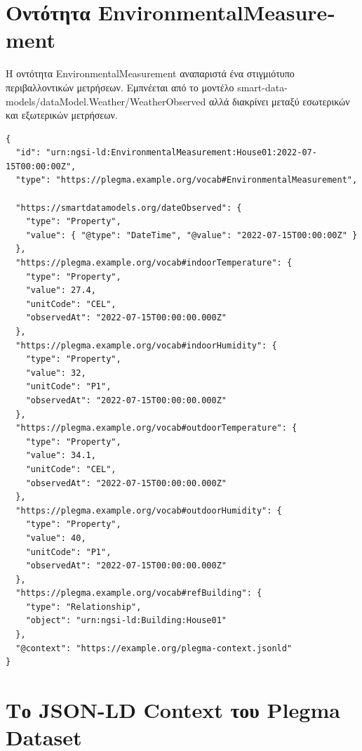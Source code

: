 \section{Οντότητα \textlatin{EnvironmentalMeasurement}}
\label{sec:entity-environmental}

Η οντότητα \textlatin{EnvironmentalMeasurement} αναπαριστά ένα στιγμιότυπο
περιβαλλοντικών μετρήσεων. Εμπνέεται από το μοντέλο
\textlatin{smart-data-models/dataModel.Weather/WeatherObserved} αλλά διακρίνει
μεταξύ εσωτερικών και εξωτερικών μετρήσεων.

\vspace{0.5cm}
\begin{lstlisting}[language={}, caption={EnvironmentalMeasurement entity for House01.}]
{
  "id": "urn:ngsi-ld:EnvironmentalMeasurement:House01:2022-07-15T00:00:00Z",
  "type": "https://plegma.example.org/vocab#EnvironmentalMeasurement",

  "https://smartdatamodels.org/dateObserved": {
    "type": "Property",
    "value": { "@type": "DateTime", "@value": "2022-07-15T00:00:00Z" }
  },
  "https://plegma.example.org/vocab#indoorTemperature": {
    "type": "Property",
    "value": 27.4,
    "unitCode": "CEL",
    "observedAt": "2022-07-15T00:00:00.000Z"
  },
  "https://plegma.example.org/vocab#indoorHumidity": {
    "type": "Property",
    "value": 32,
    "unitCode": "P1",
    "observedAt": "2022-07-15T00:00:00.000Z"
  },
  "https://plegma.example.org/vocab#outdoorTemperature": {
    "type": "Property",
    "value": 34.1,
    "unitCode": "CEL",
    "observedAt": "2022-07-15T00:00:00.000Z"
  },
  "https://plegma.example.org/vocab#outdoorHumidity": {
    "type": "Property",
    "value": 40,
    "unitCode": "P1",
    "observedAt": "2022-07-15T00:00:00.000Z"
  },
  "https://plegma.example.org/vocab#refBuilding": {
    "type": "Relationship",
    "object": "urn:ngsi-ld:Building:House01"
  },
  "@context": "https://example.org/plegma-context.jsonld"
}
\end{lstlisting}

\section{Το \textlatin{JSON-LD Context} του \textlatin{Plegma Dataset}}
\label{sec:plegma-context}

